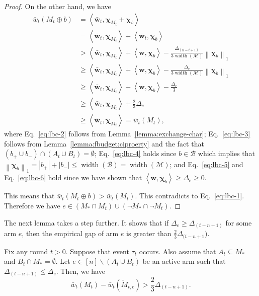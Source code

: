 \documentclass{article}
\newcommand{\M}{\mathcal M}
\newcommand{\B}{\mathcal B}
\newcommand{\del}{\backslash}
\DeclareMathOperator{\rank}{width}
\newcommand{\inn}[1]{\left\langle #1 \right\rangle}
\newcommand{\nor}[1]{\left\|#1\right\|}
\renewcommand{\vec}[1]{\boldsymbol{#1}}
\begin{document}
\begin{proof}
On the other hand, we have
\begin{align}
\bar w_t(M_t\oplus b) &= \inn{\vec{\bar w}_t, \vec \chi_{M_t} + \vec \chi_b} \label{eq:lbc-2}\\
									    &= \inn{\vec{\bar w}_t, \vec \chi_{M_t}} + \inn{\vec{\bar w}_t, \vec \chi_b}\nonumber\\
									    &> \inn{\vec{\bar w}_t, \vec \chi_{M_t}} + \inn{\vec w,\vec\chi_b} - \frac{\Delta_{(n-t+1)}}{3\rank(\M)} \nor{\vec\chi_b}_1 \label{eq:lbc-3} \\
										  &\ge \inn{\vec{\bar w}_t, \vec \chi_{M_t}} + \inn{\vec w,\vec\chi_b} - \frac{\Delta_{e}}{3\rank(\M)} \nor{\vec\chi_b}_1
										  \nonumber\\
										  &\ge \inn{\vec{\bar w}_t, \vec \chi_{M_t}} + \inn{\vec w,\vec\chi_b} - \frac{\Delta_e}{3}
										  \label{eq:lbc-4}\\
										  &\ge \inn{\vec{\bar w}_t, \vec \chi_{M_t}} + \frac{2}3 \Delta_e \label{eq:lbc-5}\\
										  &\ge \inn{\vec{\bar w}_t, \vec \chi_{M_t}} = \bar w_t(M_t), \label{eq:lbc-6}
\end{align}
where Eq.~\eqref{eq:lbc-2} follows from Lemma~\ref{lemma:exchange-char};
Eq.~\eqref{eq:lbc-3} follows from Lemma~\ref{lemma:fbudget:ciproerty} and the fact that $(b_+\cup b_-)\cap (A_t\cup B_t)=\emptyset$;
Eq.~\eqref{eq:lbc-4} holds since $b\in \B$ which implies that $\nor{\vec\chi_b}_1 = |b_+|+|b_-|\le\rank(\B)=\rank(\M)$;
and Eq.~\eqref{eq:lbc-5} and Eq.~\eqref{eq:lbc-6} hold since we have shown that $\inn{\vec w, \vec \chi_b} \ge \Delta_e \ge 0$.

This means that $\bar w_t(M_t \oplus b) > \bar w_t(M_t)$. 
This contradicts to Eq.~\eqref{eq:lbc-1}.
Therefore we have $e\in (M_* \cap M_t) \cup ( \neg M_* \cap \neg M_t)$.
\end{proof}

The next lemma takes a step further.
It shows that if $\Delta_e \ge \Delta_{(t-n+1)}$ for some arm $e$, then the empirical gap of arm $e$ is greater than $\frac23 \Delta_{(t-n+1})$.
\begin{lemma}
\label{lemma-budget-c}
Fix any round $t>0$. 
Suppose that event $\tau_t$ occurs.
Also assume that $A_t \subseteq M_*$ and $B_t \cap M_* = \emptyset$.
Let $e \in [n] \del (A_t\cup B_t)$ be an active arm such that $\Delta_{(t-n+1)} \le \Delta_e$.
Then, we have 
$$
\bar w_t(M_t) - \bar w_t(\tilde M_{t,e}) > \frac23 \Delta_{(t-n+1)}.
$$
\end{lemma}
\end{document}

